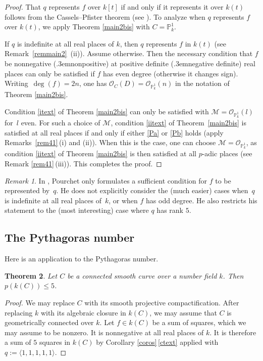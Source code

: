 \documentclass{amsart}
\newtheorem{thm}{Theorem}[section]
\theoremstyle{definition}
\theoremstyle{remark}
\newtheorem{rem}[thm]{Remark}
\numberwithin{equation}{section}
\def\resp {\text{resp.}\kern.3em}
\def\P{\mathbb P}
\def\cM{\mathcal{M}}
\def\cO{\mathcal{O}}
\def\cM{\mathcal{M}}
\begin{document}
\begin{proof}
That $q$ represents $f$ over $k[t]$ if and only if it represents it over $k(t)$ follows from the Cassels--Pfister theorem (see \cite[IX.1.3]{Lam}). To analyze when $q$ represents $f$ over $k(t)$, we apply Theorem \ref{main2bis} with $C=\P^1_k$. 

 If $q$ is indefinite at all real places of $k$, then $q$ represents $f$ in $k(t)$ (see Remark~\ref{remmain2}~(ii)). 
 Assume otherwise. Then the necessary condition that $f$ be nonnegative (\resp non\-positive) at positive definite (\resp negative definite) real places can only be satisfied if $f$ has even degree (otherwise it changes sign). Writing~$\deg(f)=2n$, one has $\cO_C(D)=\cO_{\P^1_k}(n)$ in the notation of Theorem \ref{main2bis}.
 
Condition \ref{itext} of Theorem \ref{main2bis} can only be satisfied with $\cM=\cO_{\P^1_k}(l)$ for~$l$ even. 
 For such a choice of $\cM$, condition \ref{iitext} of Theorem~\ref{main2bis} is satisfied at all real places if and only if either \ref{Pa} or \ref{Pb} holds (apply Remarks~\ref{rem41}\,(i) and (ii)).
 When this is the case, one can choose $\cM=\cO_{\P^1_k}$, as condition \ref{iitext} of Theorem \ref{main2bis} is then satisfied at all $p$-adic places (see Remark \ref{rem41}\,(iii)). This completes the proof.
 \end{proof}

\begin{rem}
In \cite[Corollaire 1 p.\,98]{Pourchet}, Pourchet only formulates a sufficient condition for $f$ to be represented by~$q$. He does not explicitly consider the (much easier) cases when~$q$ is indefinite at all real places of~$k$, or when $f$ has odd degree. He also restricts his statement to the (most interesting) case where $q$ has rank $5$.
\end{rem}

 
 \subsection{The Pythagoras number}
 \label{parPythagoras}
  
  Here is an application to the Pythagoras number.
  
 \begin{thm}
 \label{main1bis}
 Let $C$ be a connected smooth curve over a number field $k$. Then $p(k(C))\leq 5$.
 \end{thm}
 
 \begin{proof}
 We may replace $C$ with its smooth projective compactification. After replacing $k$ with its algebraic closure in $k(C)$, we may assume that $C$ is geometrically connected over $k$.
 Let $f\in k(C)$ be a sum of squares, which we may assume to be nonzero. It is nonnegative at all real places of $k$. It is therefore a sum of $5$ squares in $k(C)$ by Corollary \ref{coros}\,\ref{ctext} applied with $q:=\langle 1,1,1,1,1\rangle$.
  \end{proof}
 
\end{document}
